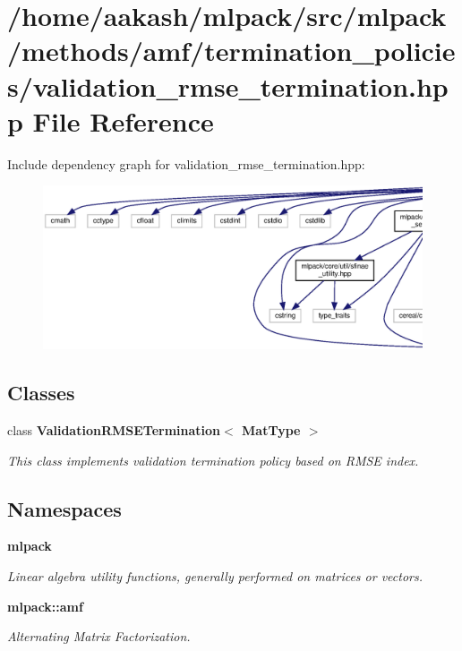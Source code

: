 \section{/home/aakash/mlpack/src/mlpack/methods/amf/termination\+\_\+policies/validation\+\_\+rmse\+\_\+termination.hpp File Reference}
\label{validation__rmse__termination_8hpp}
Include dependency graph for validation\+\_\+rmse\+\_\+termination.\+hpp\+:
\nopagebreak
\begin{figure}[H]
\begin{center}
\leavevmode
\includegraphics[width=350pt]{validation__rmse__termination_8hpp__incl}
\end{center}
\end{figure}
\subsection*{Classes}
\begin{DoxyCompactItemize}
\item 
class \textbf{ Validation\+R\+M\+S\+E\+Termination$<$ Mat\+Type $>$}
\begin{DoxyCompactList}\small\item\em This class implements validation termination policy based on R\+M\+SE index. \end{DoxyCompactList}\end{DoxyCompactItemize}
\subsection*{Namespaces}
\begin{DoxyCompactItemize}
\item 
 \textbf{ mlpack}
\begin{DoxyCompactList}\small\item\em Linear algebra utility functions, generally performed on matrices or vectors. \end{DoxyCompactList}\item 
 \textbf{ mlpack\+::amf}
\begin{DoxyCompactList}\small\item\em Alternating Matrix Factorization. \end{DoxyCompactList}\end{DoxyCompactItemize}


